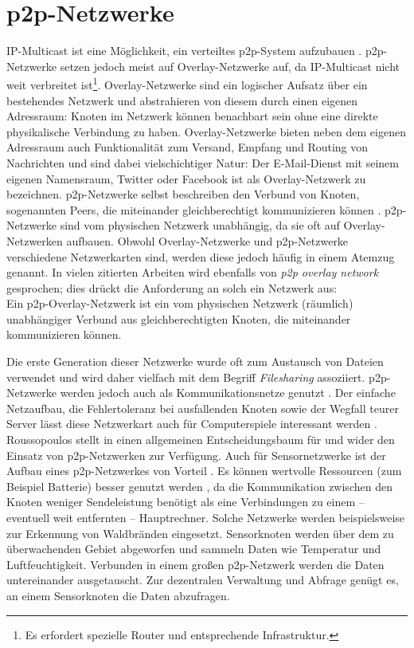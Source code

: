 \section{p2p-Netzwerke}
\label{chap:grundlagen:p2p}
IP-Multicast ist eine Möglichkeit, ein verteiltes \ac{p2p}-System aufzubauen \cite{Deering1990Multicast}. \ac{p2p}-Netzwerke setzen jedoch meist auf Overlay-Netzwerke auf, da IP-Multicast nicht weit verbreitet ist\footnote{Es erfordert spezielle Router und entsprechende Infrastruktur.}. Overlay-Netzwerke sind ein logischer Aufsatz über ein bestehendes Netzwerk und abstrahieren von diesem durch einen eigenen Adressraum: Knoten im Netzwerk können benachbart sein ohne eine direkte physikalische Verbindung zu haben. Overlay-Netzwerke bieten neben dem eigenen Adressraum auch Funktionalität zum Versand, Empfang und Routing von Nachrichten \cite{Tannenbaum2003} und sind dabei vielschichtiger Natur: Der E-Mail-Dienst mit seinem eigenen Namensraum, Twitter oder Facebook ist als Overlay-Netzwerk zu bezeichnen. p2p-Netzwerke selbst beschreiben den Verbund von Knoten, sogenannten Peers, die miteinander gleichberechtigt kommunizieren können \cite{Steinmetz2005}. p2p-Netzwerke sind vom physischen Netzwerk unabhängig, da sie oft auf Overlay-Netzwerken aufbauen. Obwohl Overlay-Netzwerke und \ac{p2p}-Netzwerke verschiedene Netzwerkarten sind, werden diese jedoch häufig in einem Atemzug genannt. In vielen zitierten Arbeiten wird ebenfalls von \emph{p2p overlay network} gesprochen; dies drückt die Anforderung an solch ein Netzwerk aus:\\
Ein p2p-Overlay-Netzwerk ist ein vom physischen Netzwerk (räumlich) unabhängiger Verbund aus gleichberechtigten Knoten, die miteinander kommunizieren können.

Die erste Generation dieser Netzwerke wurde oft zum Austausch von Dateien verwendet und wird daher vielfach mit dem Begriff \emph{Filesharing} assoziiert. p2p-Netzwerke werden jedoch auch als Kommunikationsnetze genutzt \cite{Darlagiannis2006Peertopeer}. Der einfache Netzaufbau, die Fehlertoleranz bei ausfallenden Knoten sowie der Wegfall teurer Server lässt diese Netzwerkart auch für Computerspiele interessant werden \cite{Knutsson2004Peertopeer, Triebel2008Peertopeer}. Roussopoulos stellt in \cite{Roussopoulos20032} einen allgemeinen Entscheidungsbaum für und wider den Einsatz von p2p-Netzwerken zur Verfügung. Auch für Sensornetzwerke ist der Aufbau eines p2p-Netzwerkes von Vorteil \cite{MuneebAliandKoenLangendoen2007Case}. Es können wertvolle Ressourcen (zum Beispiel Batterie) besser genutzt werden \cite{Sioutas2009Building}, da die Kommunikation zwischen den Knoten weniger Sendeleistung benötigt als eine Verbindungen zu einem -- eventuell weit entfernten -- Hauptrechner. Solche Netzwerke werden beispielsweise zur Erkennung von Waldbränden eingesetzt. Sensorknoten werden über dem zu überwachenden Gebiet abgeworfen und sammeln Daten wie Temperatur und Luftfeuchtigkeit. Verbunden in einem großen p2p-Netzwerk werden die Daten untereinander ausgetauscht. Zur dezentralen Verwaltung und Abfrage genügt es, an einem Sensorknoten die Daten abzufragen.

